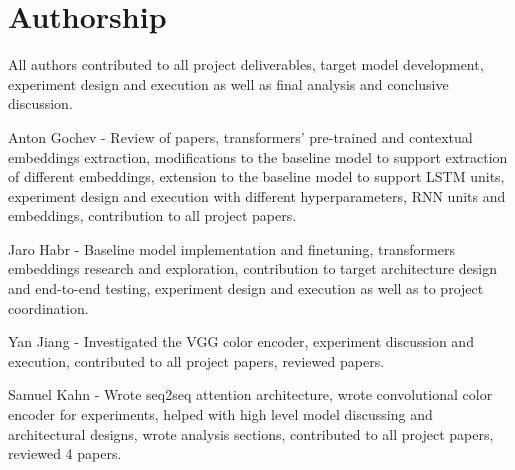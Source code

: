 \section*{Authorship}

All authors contributed to all project deliverables, target model development, experiment design and execution as well as final analysis and conclusive discussion.

Anton Gochev - Review of papers, transformers’ pre-trained and contextual embeddings extraction, modifications to the baseline model to support extraction of different embeddings, extension to the baseline model to support LSTM units, experiment design and execution with different hyperparameters, RNN units and embeddings, contribution to all project papers.

Jaro Habr - Baseline model implementation and finetuning, transformers embeddings research and exploration, contribution to target architecture design and end-to-end testing, experiment design and execution as well as to project coordination.

Yan Jiang - Investigated the VGG color encoder, experiment discussion and execution, contributed to all project papers, reviewed papers.

Samuel Kahn - Wrote seq2seq attention architecture, wrote convolutional color encoder for experiments, helped with high level model discussing and architectural designs, wrote analysis sections, contributed to all project papers, reviewed 4 papers.
